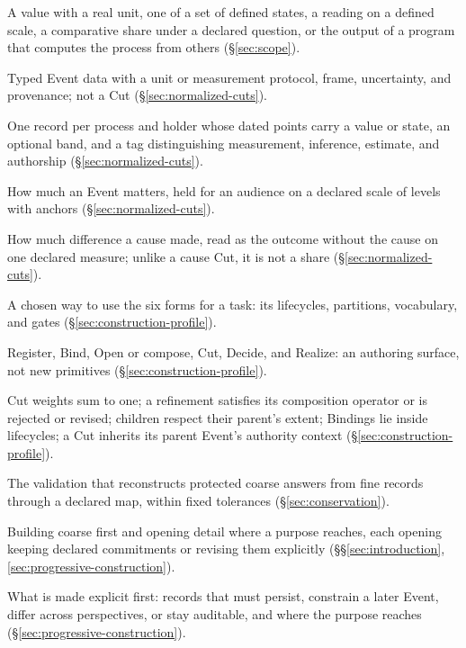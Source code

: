 \documentclass[11pt,a4paper]{article}
\begin{document}
\begin{small}
\begin{description}[leftmargin=0pt,itemsep=1pt,parsep=0pt]
\item[Five kinds of state value] A value with a real unit, one of a set of defined
states, a reading on a defined scale, a comparative share under a declared
question, or the output of a program that computes the process from others
(\S\ref{sec:scope}).
\item[World datum] Typed Event data with a unit or measurement protocol, frame,
uncertainty, and provenance; not a Cut (\S\ref{sec:normalized-cuts}).
\item[Value series] One record per process and holder whose dated points carry a
value or state, an optional band, and a tag distinguishing measurement,
inference, estimate, and authorship (\S\ref{sec:normalized-cuts}).
\item[Importance] How much an Event matters, held for an audience on a declared
scale of levels with anchors (\S\ref{sec:normalized-cuts}).
\item[Cause assessment] How much difference a cause made, read as the outcome
without the cause on one declared measure; unlike a cause Cut, it is not a share
(\S\ref{sec:normalized-cuts}).
\item[Construction profile] A chosen way to use the six forms for a task: its
lifecycles, partitions, vocabulary, and gates
(\S\ref{sec:construction-profile}).
\item[Six operation families] Register, Bind, Open or compose, Cut, Decide, and
Realize: an authoring surface, not new primitives
(\S\ref{sec:construction-profile}).
\item[Five cross-record rules] Cut weights sum to one; a refinement satisfies
its composition operator or is rejected or revised; children respect their
parent's extent; Bindings lie inside lifecycles; a Cut inherits its parent
Event's authority context (\S\ref{sec:construction-profile}).
\item[Close] The validation that reconstructs protected coarse answers from fine
records through a declared map, within fixed tolerances
(\S\ref{sec:conservation}).
\item[Progressive resolution] Building coarse first and opening detail where a
purpose reaches, each opening keeping declared commitments or revising them
explicitly (\S\S\ref{sec:introduction}, \ref{sec:progressive-construction}).
\item[Order of opening] What is made explicit first: records that must persist,
constrain a later Event, differ across perspectives, or stay auditable, and
where the purpose reaches (\S\ref{sec:progressive-construction}).

\end{description}
\end{small}
\end{document}
